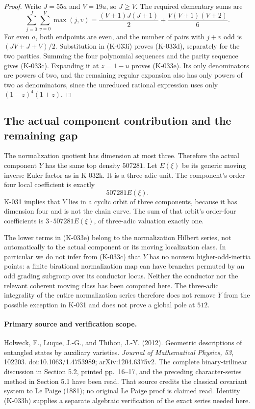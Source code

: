 \begin{proof}
Write $J=55a$ and $V=19a$, so $J\ge V$.  The required elementary
sums are
\[
 \sum_{j=0}^{J}\sum_{v=0}^{V}\max(j,v)
  =\frac{(V+1)J(J+1)}2+\frac{V(V+1)(V+2)}6.
\]
For even $a$, both endpoints are even, and the number of pairs
with $j+v$ odd is $(JV+J+V)/2$.  Substitution in (K-033i) proves
(K-033d), separately for the two parities.  Summing the four
polynomial sequences and the parity sequence gives (K-033c).
Expanding it at $z=1-u$ proves (K-033e).  Its only denominators
are powers of two, and the remaining regular expansion also has
only powers of two as denominators, since the unreduced rational
expression uses only $(1-z)^4(1+z)$.
\end{proof}

\subsection*{The actual component contribution and the remaining gap}

The normalization quotient has dimension at most three.  Therefore
the actual component $Y$ has the same top density $507281$.
Let $E(\xi)$ be its generic moving inverse Euler factor as in
K-032k.  It is a three-adic unit.  The component's order-four local
coefficient is exactly
\[
                            507281 E(\xi).             \tag{K-033j}
\]
K-031 implies that $Y$ lies in a cyclic orbit of three components,
because it has dimension four and is not the chain curve.  The
sum of that orbit's order-four coefficients is
$3\cdot507281 E(\xi)$, of three-adic valuation exactly one.

The lower terms in (K-033e) belong to the normalization Hilbert
series, not automatically to the actual component or its moving
localization class.  In particular we do not infer from (K-033c)
that $Y$ has no nonzero higher-odd-inertia points: a finite
birational normalization map can have branches permuted by an
odd grading subgroup over its conductor locus.  Neither the
conductor nor the relevant coherent moving class has been computed
here.  The three-adic integrality of the entire normalization
series therefore does not remove $Y$ from the possible exception
in K-031 and does not prove a global pole at $512$.

\paragraph{Primary source and verification scope.}
Holweck, F., Luque, J.-G., and Thibon, J.-Y. (2012).
Geometric descriptions of entangled states by auxiliary varieties.
\emph{Journal of Mathematical Physics, 53}, 102203.
doi:10.1063/1.4753989; arXiv:1204.6375v2.
The complete binary-trilinear discussion in Section 5.2, printed
pp.~16--17, and the preceding character-series method in Section
5.1 have been read.  That source credits the classical covariant
system to Le Paige (1881); no original Le Paige proof is claimed
read.  Identity (K-033h) supplies a separate algebraic verification
of the exact series needed here.
